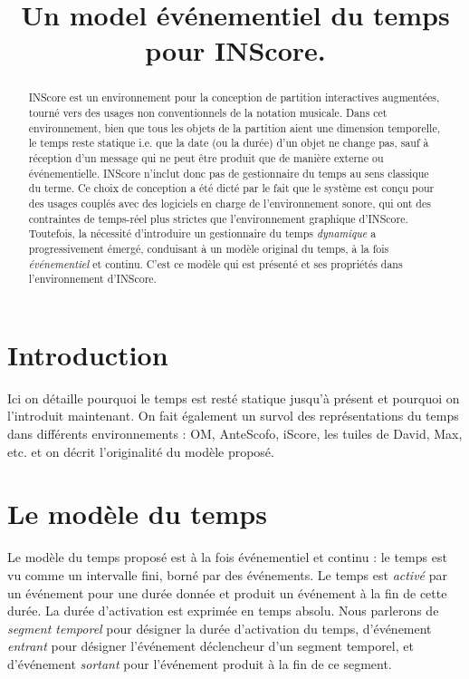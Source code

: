 \documentclass{article}
\title{Un model événementiel du temps pour INScore.}
\begin{document}
%
\maketitle
%
\begin{abstract}
INScore est un environnement pour la conception de partition interactives augmentées, tourné vers des usages non conventionnels de la notation musicale. Dans cet environnement, bien que tous les objets de la partition aient une dimension temporelle, le temps reste statique i.e. que la date (ou la durée) d'un objet ne change pas, sauf à réception d'un message qui ne peut être produit que de manière externe ou événementielle. INScore n'inclut donc pas de gestionnaire du temps au sens classique du terme. 
Ce choix de conception a été dicté par le fait que le système est conçu pour des usages couplés avec des logiciels en charge de l'environnement sonore, qui ont des contraintes de temps-réel plus strictes que l'environnement graphique d'INScore.
Toutefois, la nécessité d'introduire un gestionnaire du temps \emph{dynamique} a progressivement émergé, conduisant à un modèle original du temps, à la fois \emph{événementiel} et continu. C'est ce modèle qui est présenté et ses propriétés dans l'environnement d'INScore.
\end{abstract}

\section{Introduction}\label{sec:introduction}

Ici on détaille pourquoi le temps est resté statique jusqu'à présent et pourquoi on l'introduit maintenant.
On fait également un survol des représentations du temps dans différents environnements : OM, AnteScofo, iScore, les tuiles de David, Max, etc. et on décrit l'originalité du modèle proposé.


\section{Le modèle du temps}\label{overview}

Le modèle du temps proposé est à la fois événementiel et continu : le temps est vu comme un intervalle fini, borné par des événements. Le temps est \emph{activé} par un événement pour une durée donnée et produit un événement à la fin de cette durée. La durée d'activation est exprimée en temps absolu. Nous parlerons de \emph{segment temporel} pour désigner la durée d'activation du temps, d'événement \emph{entrant} pour désigner l'événement déclencheur d'un segment temporel, et d'événement \emph{sortant} pour l'événement produit à la fin de ce segment.
\end{document}
